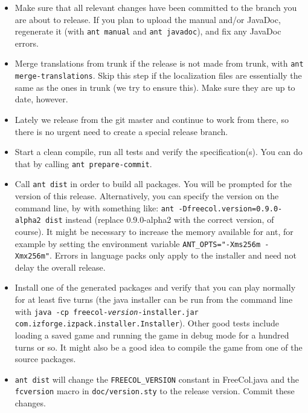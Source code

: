 \documentclass[12pt]{book}
\begin{document}
\begin{itemize}

\item Make sure that all relevant changes have been committed to the
  branch you are about to release.  If you plan to upload the manual
  and/or JavaDoc, regenerate it (with \verb+ant manual+ and
  \verb+ant javadoc+), and fix any JavaDoc errors.

\item Merge translations from trunk if the release is not made from
  trunk, with \verb+ant merge-translations+.  Skip this step if the
  localization files are essentially the same as the ones in trunk (we
  try to ensure this).  Make sure they are up to date, however.

\item Lately we release from the git master and continue to work from
  there, so there is no urgent need to create a special release branch.

\item Start a clean compile, run all tests and verify the
  specification(s). You can do that by calling \verb+ant prepare-commit+.
 
\item Call \verb+ant dist+ in order to build all packages. You will be
  prompted for the version of this release. Alternatively, you can
  specify the version on the command line, by with something like:
  \verb+ant -Dfreecol.version=0.9.0-alpha2 dist+ instead (replace
  0.9.0-alpha2 with the correct version, of course). It might be
  necessary to increase the memory available for ant, for example by
  setting the environment variable
  \verb|ANT_OPTS="-Xms256m -Xmx256m"|.  Errors in language packs only
  apply to the installer and need not delay the overall release.

\item Install one of the generated packages and verify that you can
  play normally for at least five turns (the java installer can be run
  from the command line with \texttt{java -cp
    freecol-\emph{version}-installer.jar
    com.izforge.izpack.installer.Installer}).  Other good tests
  include loading a saved game and running the game in debug mode for
  a hundred turns or so.  It might also be a good idea to compile the
  game from one of the source packages.

\item \verb+ant dist+ will change the \verb+FREECOL_VERSION+ constant
  in FreeCol.java and the \verb+fcversion+ macro in
  \texttt{doc/version.sty} to the release version.  Commit these changes.


\end{itemize}
\end{document}
